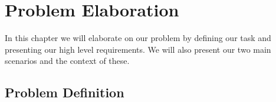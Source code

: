 \chapter{Problem Elaboration}
\label{chap:problemelaboration}
%
%
\label{problemelaboration}
In this chapter we will elaborate on our problem by defining our task and presenting our high level requirements.
We will also present our two main scenarios and the context of these. 


\section{Problem Definition}
\label{problemdefinition}

